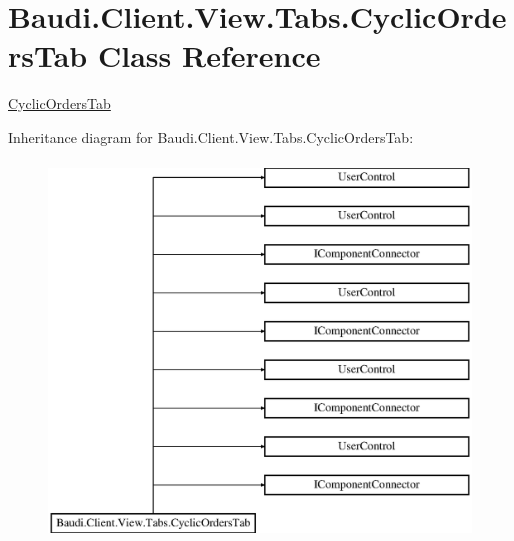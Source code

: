 \hypertarget{class_baudi_1_1_client_1_1_view_1_1_tabs_1_1_cyclic_orders_tab}{}\section{Baudi.\+Client.\+View.\+Tabs.\+Cyclic\+Orders\+Tab Class Reference}
\label{class_baudi_1_1_client_1_1_view_1_1_tabs_1_1_cyclic_orders_tab}


\hyperlink{class_baudi_1_1_client_1_1_view_1_1_tabs_1_1_cyclic_orders_tab}{Cyclic\+Orders\+Tab}  


Inheritance diagram for Baudi.\+Client.\+View.\+Tabs.\+Cyclic\+Orders\+Tab\+:\begin{figure}[H]
\begin{center}
\leavevmode
\includegraphics[height=10.000000cm]{class_baudi_1_1_client_1_1_view_1_1_tabs_1_1_cyclic_orders_tab}
\end{center}
\end{figure}
